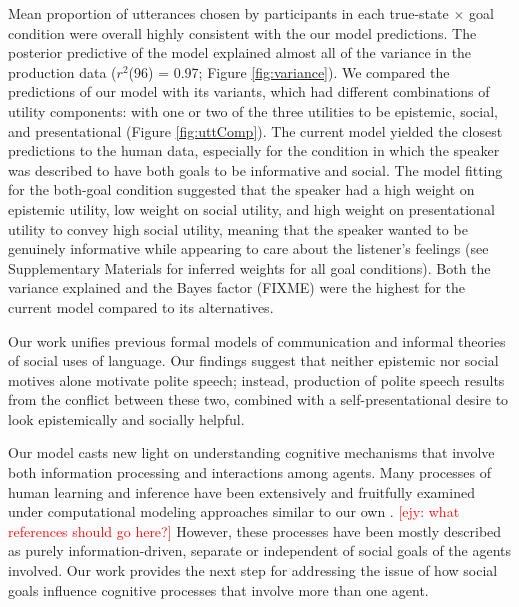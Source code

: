 \documentclass[12pt]{article}
\newcommand{\ejy}[1]{\textcolor{Red}{[ejy: #1]}}
\begin{document}
Mean proportion of utterances chosen by participants in each true-state \(\times\) goal condition were 
overall highly consistent with the our model predictions. 
The posterior predictive of the model explained almost all of the variance in the production data 
(\(r^2\)(96) = 0.97; Figure \ref{fig:variance}). 
We compared the predictions of our model with its variants, which had different combinations of utility components: 
with one or two of the three utilities to be epistemic, social, and presentational (Figure \ref{fig:uttComp}). 
The current model yielded the closest predictions to the human data, especially for the condition in which the speaker was described to have both goals to be informative and social.
The model fitting for the both-goal condition suggested that 
the speaker had a high weight on epistemic utility, low weight on social utility, 
and high weight on presentational utility to convey high social utility, 
meaning that the speaker wanted to be genuinely informative while appearing to care about the listener's feelings
(see Supplementary Materials for inferred weights for all goal conditions). 
Both the variance explained and the Bayes factor (FIXME) were the highest for the current model compared to its alternatives.



Our work unifies previous formal models of communication and informal
theories of social uses of language. Our findings suggest that neither
epistemic nor social motives alone motivate polite speech; instead,
production of polite speech results from the conflict between these two,
combined with a self-presentational desire to look epistemically
and socially helpful. 

Our model casts new light on understanding cognitive mechanisms 
that involve both information processing and interactions among agents. 
Many processes of human learning and inference
have been extensively and fruitfully examined under computational modeling approaches similar to our own
\cite{tenenbaum2011, xu2007, bonawitz2011, baker2009}. \ejy{what references should go here?}
However, these processes have been mostly described as purely information-driven, 
separate or independent of social goals of the agents involved.
Our work provides the next step for addressing the issue of 
how social goals influence cognitive processes that involve more than one agent. 
\end{document}
